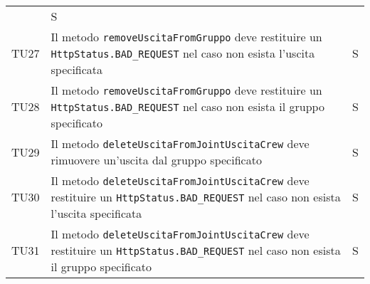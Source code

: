 \begin{center}
{\begin{longtable}{
      |>{\centering\arraybackslash}p{48pt}
      |>{\centering\arraybackslash}p{308pt}
      |>{\centering\arraybackslash}p{27pt}|}
                  & S                                              \\
      TU27
                  & Il metodo \texttt{removeUscitaFromGruppo} deve
      restituire un \texttt{HttpStatus.BAD\_REQUEST} nel caso non esista
      l'uscita
      specificata
                  & S                                              \\
      TU28
                  & Il metodo \texttt{removeUscitaFromGruppo} deve
      restituire un \texttt{HttpStatus.BAD\_REQUEST} nel caso non esista il
      gruppo
      specificato
                  & S                                              \\
      TU29
                  & Il metodo
      \texttt{deleteUscitaFromJointUscitaCrew} deve rimuovere un'uscita dal
      gruppo
      specificato
                  & S                                              \\
      TU30
                  & Il metodo
      \texttt{deleteUscitaFromJointUscitaCrew} deve restituire un
      \texttt{HttpStatus.BAD\_REQUEST} nel caso non esista l'uscita specificata
                  & S
      \\
      TU31
                  & Il metodo
      \texttt{deleteUscitaFromJointUscitaCrew} deve restituire un
      \texttt{HttpStatus.BAD\_REQUEST} nel caso non esista il gruppo
      specificato &
      S
      \\

    \end{longtable}
  }
\end{center}